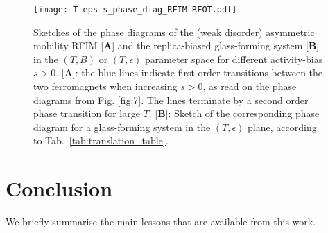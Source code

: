 \documentclass{iopart}
\begin{document}
%  
  
  \begin{figure}
  \centering
  \texttt{[image: T-eps-s\_phase\_diag\_RFIM-RFOT.pdf]}
  \caption{Sketches of the phase diagrams of the (weak disorder) asymmetric mobility RFIM [\textbf{A}] and the replica-biased glass-forming system [\textbf{B}] in the $(T,B)$ or $(T,\epsilon)$ parameter space for different activity-bias $s>0$. [\textbf{A}]: the blue lines indicate first order transitions between the two ferromagnets when increasing $s>0$, as read on the phase diagrams from Fig. \ref{fig:7}. The lines terminate by a second order phase transition for large $T$. [\textbf{B}]: Sketch of the corresponding phase diagram for a glass-forming system in the $(T,\epsilon)$ plane, according to Tab.~\ref{tab:translation_table}.}
  \label{fig:9}
\end{figure} 

\section{Conclusion}
\label{sec:conc}

We briefly summarise the main lessons that are available from this work.  
\end{document}
